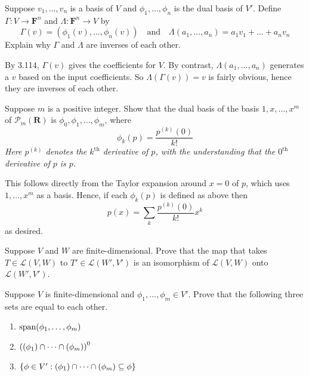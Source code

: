 \documentclass[10pt]{article}
\begin{document}
	\begin{problem}
		Suppose \( v_1, \dots, v_n \) is a basis of \( V \) and \( \phi_1, \dots, \phi_n \) is the dual basis
		of \( V' \). Define \( \Gamma : V \to \mathbf{F}^{n} \) and \( \Lambda: \mathbf{F}^{n} \to V \) by
		\[
			\Gamma(v) = (\phi_1(v), \dots, \phi_n(v)) \quad \text{and} \quad \Lambda(a_1, \dots, a_n) =
			a_1v_1 + \dots + a_n v_n
		\]
		Explain why \( \Gamma \) and \( \Lambda \) are inverses of each other. 
	\end{problem}

	\begin{solution}
		By 3.114, \( \Gamma(v) \) gives the coefficients for \( V \). By contrast, \( \Lambda(a_1, \dots,
		a_n) \) generates a \( v \) based on the input coefficients. So \( \Lambda(\Gamma(v)) = v \) is
		fairly obvious, hence they are inverses of each other. 
	\end{solution}

	\begin{problem}
		Suppose \( m \) is a positive integer. Show that the dual basis of the basis \( 1, x, \dots, x^{m}
		\)of \( \mathcal{P}_m(\mathbf{R}) \) is \( \phi_0, \phi_1, \dots, \phi_m \), where 
		\[
			\phi_k(p) = \frac{p^{(k)}(0)}{k!}
		\]
		\textit{Here \( p^{(k)} \) denotes the \( k^{\text{th}} \) derivative of \( p \), with the
		understanding that the \( 0^{\text{th}} \) derivative of \( p \) is \( p \).}
	\end{problem}

	\begin{solution}
		This follows directly from the Taylor expansion around \( x = 0  \) of \( p \), which uses \( 1,
		\dots, x^{m} \) as a basis. Hence, if each \( \phi_k(p) \) is defined as above then
		\[
			p(x) = \sum_k \frac{p^{(k)}(0)}{k!} x^{k}
		\]
		as desired. 
	\end{solution}

	\begin{problem}
		Suppose \( V \) and \( W \) are finite-dimensional. Prove that the map that takes \( T \in
		\mathcal{L}(V, W) \) to \( T' \in \mathcal{L}(W', V') \) is an isomorphism of \( \mathcal{L}(V, W) \)
		onto \( \mathcal{L}(W', V') \). 
	\end{problem}

	\begin{problem}
		Suppose \( V \) is finite-dimensional and \( \phi_1, \dots, \phi_m \in V' \). Prove that the
		following three sets are equal to each other. 
		\begin{enumerate}[label=(\alph*)]
			\item \( \operatorname*{span}(\phi_1, \dots, \phi_m) \)
			\item \( \left( (\null \phi_1) \cap \dots \cap (\null \phi_m) \right)^{0} \)
			\item \( \{\phi \in V' : (\null \phi_1) \cap \dots \cap (\null \phi_m) \subseteq \null \phi \} \)
		\end{enumerate}
	\end{problem}
\end{document}

